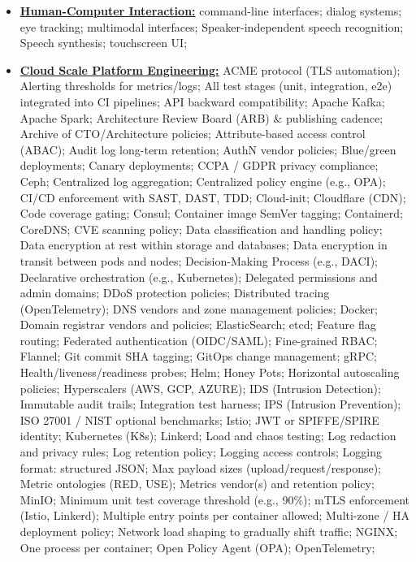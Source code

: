 \documentclass[letterpaper,11pt]{article}
\begin{document}
\begin{multicols}{4}
{\begin{itemize}[leftmargin=0.1in, label={}, itemsep=0pt, parsep=0pt, topsep=0pt, partopsep=0pt]
\item
\textbf{\uline{Human-Computer Interaction:}} \hspace{0pt}
command-line interfaces;
dialog systems;
eye tracking;
multimodal interfaces;
Speaker-independent speech recognition;
Speech synthesis;
touchscreen UI;
\item
\textbf{\uline{Cloud Scale Platform Engineering:}} \hspace{0pt}
ACME protocol (TLS automation);
Alerting thresholds for metrics/logs;
All test stages (unit, integration, e2e) integrated into CI pipelines;
API backward compatibility;
Apache Kafka;
Apache Spark;
Architecture Review Board (ARB) \& publishing cadence;
Archive of CTO/Architecture policies;
Attribute-based access control (ABAC);
Audit log long-term retention;
AuthN vendor policies;
Blue/green deployments;
Canary deployments;
CCPA / GDPR privacy compliance;
Ceph;
Centralized log aggregation;
Centralized policy engine (e.g., OPA);
CI/CD enforcement with SAST, DAST, TDD;
Cloud-init;
Cloudflare (CDN);
Code coverage gating;
Consul;
Container image SemVer tagging;
Containerd;
CoreDNS;
CVE scanning policy;
Data classification and handling policy;
Data encryption at rest within storage and databases;
Data encryption in transit between pods and nodes;
Decision-Making Process (e.g., DACI);
Declarative orchestration (e.g., Kubernetes);
Delegated permissions and admin domains;
DDoS protection policies;
Distributed tracing (OpenTelemetry);
DNS vendors and zone management policies;
Docker;
Domain registrar vendors and policies;
ElasticSearch;
etcd;
Feature flag routing;
Federated authentication (OIDC/SAML);
Fine-grained RBAC;
Flannel;
Git commit SHA tagging;
GitOps change management;
gRPC;
Health/liveness/readiness probes;
Helm;
Honey Pots;
Horizontal autoscaling policies;
Hyperscalers (AWS, GCP, AZURE);
IDS (Intrusion Detection);
Immutable audit trails;
Integration test harness;
IPS (Intrusion Prevention);
ISO 27001 / NIST optional benchmarks;
Istio;
JWT or SPIFFE/SPIRE identity;
Kubernetes (K8s);
Linkerd;
Load and chaos testing;
Log redaction and privacy rules;
Log retention policy;
Logging access controls;
Logging format: structured JSON;
Max payload sizes (upload/request/response);
Metric ontologies (RED, USE);
Metrics vendor(s) and retention policy;
MinIO;
Minimum unit test coverage threshold (e.g., 90\%);
mTLS enforcement (Istio, Linkerd);
Multiple entry points per container allowed;
Multi-zone / HA deployment policy;
Network load shaping to gradually shift traffic;
NGINX;
One process per container;
Open Policy Agent (OPA);
OpenTelemetry;

\end{itemize}}
\end{multicols}
\end{document}
